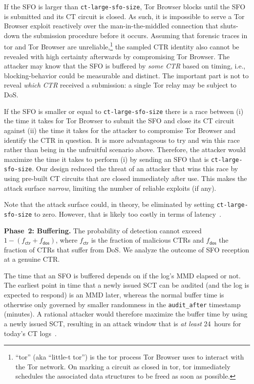 If the SFO is larger than \texttt{ct-large-sfo-size}, Tor Browser blocks until
the SFO is submitted and its CT circuit is closed.  As such, it is impossible to
serve a Tor Browser exploit reactively over the man-in-the-middled connection
that shuts-down the submission procedure before it occurs.  Assuming that
forensic traces in tor and Tor Browser are unreliable,\footnote{%
	``tor'' (aka ``little-t tor'') is the tor process Tor Browser uses to
	interact with the Tor network.  On marking a circuit as closed in tor, tor
	immediately schedules the associated data structures to be freed as soon as
	possible.
} the sampled CTR identity also cannot be revealed with high certainty
afterwards by compromising Tor Browser.  The attacker may know that the SFO is
buffered by \emph{some CTR} based on timing, i.e., blocking-behavior could be 
measurable and distinct.  The important part is not to reveal \emph{which CTR}
received a submission:  a single Tor relay may be subject to DoS.

If the SFO is smaller or equal to \texttt{ct-large-sfo-size} there is a
race between (i) the time it takes for Tor Browser to submit the SFO and close
its CT circuit against (ii) the time it takes for the attacker to compromise Tor
Browser and identify the CTR in question.  It is more advantageous to try and
win this race rather than being in the unfruitful scenario above.  Therefore,
the attacker would maximize the time it takes to perform (i) by sending an SFO
that is \texttt{ct-large-sfo-size}.  Our design reduced the threat of an
attacker that wins this race by using pre-built CT circuits that are closed
immediately after use.  This makes the attack surface \emph{narrow}, limiting
the number of reliable exploits (if any).

Note that the attack surface could, in theory, be eliminated by setting
\texttt{ct-large-sfo-size} to zero.  However, that is likely  too costly in
terms of latency~\cite{no-hard-fail}.

\textbf{Phase~2: Buffering.}
The probability of detection cannot exceed $1-(f_{\mathsf{ctr}} +
f_{\mathsf{dos}})$, where $f_{\mathsf{ctr}}$ is the fraction of
malicious CTRs and $f_{\mathsf{dos}}$ the fraction of CTRs that suffer from
DoS.  We analyze the outcome of SFO reception at a genuine CTR\@.

The time that an SFO is buffered depends on if the log's MMD elapsed or not.
The earliest point in time that a newly issued SCT can be audited (and the log
is expected to respond) is an MMD later, whereas the normal buffer time is
otherwise only governed by smaller randomness in the \texttt{audit\_after}
timestamp (minutes).  A rational attacker would therefore maximize the buffer
time by using a newly issued SCT, resulting in an attack window that is \emph{at
least} 24~hours for today's CT logs~\cite{google-log-policy}.

